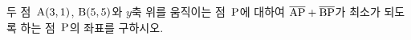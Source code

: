 두 점~$\mathrm{A}(3{,}\mkern3mu\mathopen{}1)$, $\mathrm{B}(5{,}\mkern3mu\mathopen{}5)$와 $y$축 위를 움직이는 점~$\mathrm{P}$에 대하여 $\overline{\mathrm{AP}}+\overline{\mathrm{BP}}$가 최소가 되도록 하는 점~$\mathrm{P}$의 좌표를 구하시오.
